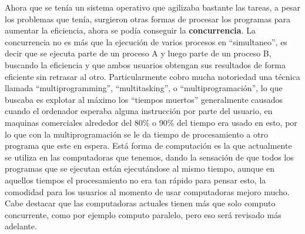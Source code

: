 \documentclass[letterpaper,12pt,oneside]{book}
\begin{document}
		Ahora que se tenía un sistema operativo que agilizaba bastante las tareas, a pesar los problemas que tenía, surgieron otras formas de procesar
		los programas para aumentar la eficiencia, ahora se podía conseguir la \textbf{concurrencia}. La concurrencia no es más que la ejecución de varios
		procesos en ``simultaneo'', es decir que se ejecuta parte de un proceso A y luego parte de un proceso B, buscando la eficiencia y que ambos usuarios obtengan
		sus resultados de forma eficiente sin retrasar al otro. Particularmente cobro mucha notoriedad una técnica llamada ``multiprogramming'', ``multitasking'',
		o ``multiprogramación'', lo que buscaba es explotar al máximo los ``tiempos muertos'' generalmente causados cuando el ordenador esperaba alguna instrucción por
		parte del usuario, en maquinas comerciales alrededor del 80\% o 90\% del tiempo era usado en esto, por lo que con  la multiprogramación se le da tiempo
		de procesamiento a otro programa que este en espera. Está forma de computación es la que actualmente se utiliza en las computadoras que tenemos, dando
		la sensación de que todos los programas que se ejecutan están ejecutándose al mismo tiempo, aunque en aquellos tiempos el procesamiento no era
		tan rápido para pensar esto, la comodidad para los usuarios al momento de usar computadoras mejoro mucho. Cabe destacar que las computadoras actuales tienen
		más que solo computo concurrente, como por ejemplo computo paralelo, pero eso será revisado más adelante.
		
		
\end{document}
